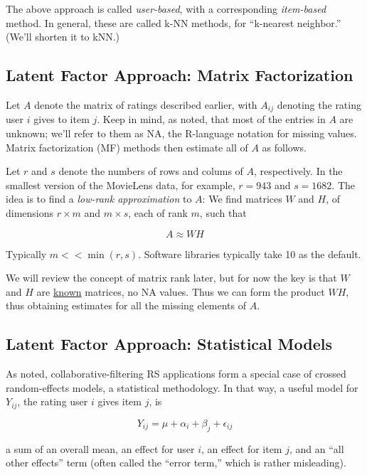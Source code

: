 The above approach is called \textit{user-based}, with a corresponding
\textit{item-based} method.  In general, these are called k-NN methods,
for ``k-nearest neighbor.''  (We'll shorten it to kNN.)

\subsection{Latent Factor Approach:  Matrix Factorization}
\label{mf}

Let $A$ denote the matrix of ratings described earlier, with $A_{ij}$
denoting the rating user $i$ gives to item $j$.  Keep in mind, as noted,
that most of the entries in $A$ are unknown; we'll refer to them as NA,
the R-language notation for missing values.  Matrix factorization (MF)
methods then estimate all of $A$ as follows.

Let $r$ and $s$ denote the numbers of rows and colums of $A$,
respectively.  In the smallest version of the MovieLens data, for
example, $r = 943$ and $s = 1682$.  The idea is to find a
\textit{low-rank approximation} to $A$:  We find matrices $W$ and $H$,
of dimensions $r \times m$ and $m \times s$, each of rank $m$, such that 

\begin{equation}
A \approx WH
\end{equation}

Typically $m << \min(r,s)$.  Software libraries typically take 10 as the
default.

We will review the concept of matrix rank later, but for now the key is
that $W$ and $H$ are \underline{known} matrices, no NA values.  Thus we
can form the product $WH$, thus obtaining estimates for all the missing
elements of $A$.

\subsection{Latent Factor Approach: Statistical Models}

As noted, collaborative-filtering RS applications form a special case of
crossed random-effects models, a statistical methodology.  In that way,
a useful model for $Y_{ij}$, the rating user $i$ gives item $j$, is

\begin{equation}
Y_{ij} = \mu + \alpha_i + \beta_j + \epsilon_{ij}
\end{equation}

a sum of an overall mean, an effect for user $i$, an effect for item
$j$, and an ``all other effects'' term (often called the ``error term,''
which is rather misleading).  

